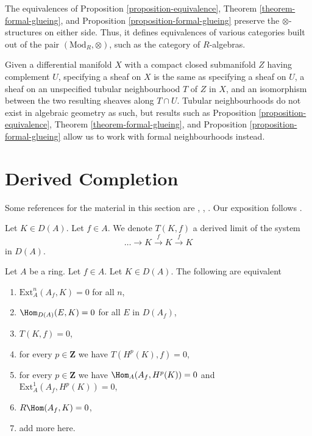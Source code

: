 \begin{remark}
\label{remark-formal-glueing-algebras}
The equivalences of
Proposition \ref{proposition-equivalence},
Theorem \ref{theorem-formal-glueing}, and
Proposition \ref{proposition-formal-glueing}
preserve the $\otimes$-structures on either side.
Thus, it defines equivalences of various categories
built out of the pair $(\text{Mod}_R, \otimes)$, such as the category of
$R$-algebras.
\end{remark}

\begin{remark}
\label{remark-topological-analogue}
Given a differential manifold $X$ with a compact closed submanifold $Z$
having complement $U$, specifying a sheaf on $X$ is the same as specifying
a sheaf on $U$, a sheaf on an unspecified tubular neighbourhood $T$ of $Z$ in
$X$, and an isomorphism between the two resulting sheaves along $T \cap U$.
Tubular neighbourhoods do not exist in algebraic geometry as such, but
results such as
Proposition \ref{proposition-equivalence},
Theorem \ref{theorem-formal-glueing}, and
Proposition \ref{proposition-formal-glueing}
allow us to work with formal neighbourhoods instead.
\end{remark}















\section{Derived Completion}
\label{section-derived-completion}

\noindent
Some references for the material in this section are
\cite{Dwyer-Greenlees}, \cite{Greenlees-May}, \cite{dag12}.
Our exposition follows \cite{BS}.

\medskip\noindent
Let $K \in D(A)$. Let $f \in A$. We denote $T(K, f)$ a derived limit
of the system
$$
\ldots \to K \xrightarrow{f} K \xrightarrow{f} K
$$
in $D(A)$.

\begin{lemma}
\label{lemma-hom-from-Af}
Let $A$ be a ring. Let $f \in A$. Let $K \in D(A)$.
The following are equivalent
\begin{enumerate}
\item $\text{Ext}^n_A(A_f, K) = 0$ for all $n$,
\item $\Hom_{D(A)}(E, K) = 0$ for all $E$ in $D(A_f)$,
\item $T(K, f) = 0$,
\item for every $p \in \mathbf{Z}$ we have $T(H^p(K), f) = 0$,
\item for every $p \in \mathbf{Z}$ we have
$\Hom_A(A_f, H^p(K)) = 0$ and $\text{Ext}^1_A(A_f, H^p(K)) = 0$,
\item $R\Hom(A_f, K) = 0$,
\item add more here.
\end{enumerate}
\end{lemma}

